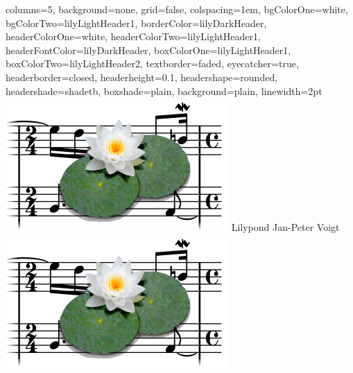 \documentclass[a0paper,landscape]{baposter}
\begin{document}
\begin{poster}{%
	columns=5,
	background=none,
	grid=false,
	colspacing=1em,
	bgColorOne=white,
	bgColorTwo=lilyLightHeader1,
	borderColor=lilyDarkHeader,
	headerColorOne=white,
	headerColorTwo=lilyLightHeader1,
	headerFontColor=lilyDarkHeader,
	boxColorOne=lilyLightHeader1,
	boxColorTwo=lilyLightHeader2,
	textborder=faded,
	eyecatcher=true,
	headerborder=closed,
	headerheight=0.1\textheight,
	headershape=rounded,
	headershade=shadetb,
	boxshade=plain,
	background=plain,
	linewidth=2pt
	}
  {
  	\includegraphics[width=0.14\linewidth]{double-lily-modified3.png}
  }
  {Lilypond}
  {Jan-Peter Voigt}
  {\includegraphics[width=.14\textwidth]{double-lily-modified3.png}}
  
  
\end{poster}
\end{document}
